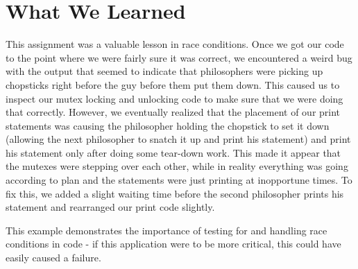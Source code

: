 \documentclass[letterpaper,10pt,titlepage]{article}
\begin{document}
\section {What We Learned}
This assignment was a valuable lesson in race conditions. 
Once we got our code to the point where we were fairly sure it was correct, we encountered a weird bug with the output
that seemed to indicate that philosophers were picking up chopsticks right before the guy before them put them down.
This caused us to inspect our mutex locking and unlocking code to make sure that we were doing that correctly.
However, we eventually realized that the placement of our print statements was causing the philosopher holding the chopstick
to set it down (allowing the next philosopher to snatch it up and print his statement) and print his statement only after
doing some tear-down work.
This made it appear that the mutexes were stepping over each other, while in reality everything was going according to plan
and the statements were just printing at inopportune times. 
To fix this, we added a slight waiting time before the second philosopher prints his statement and rearranged our print code slightly.

This example demonstrates the importance of testing for and handling race conditions in code - if this application were
to be more critical, this could have easily caused a failure. 




%
%
%
\end{document}
